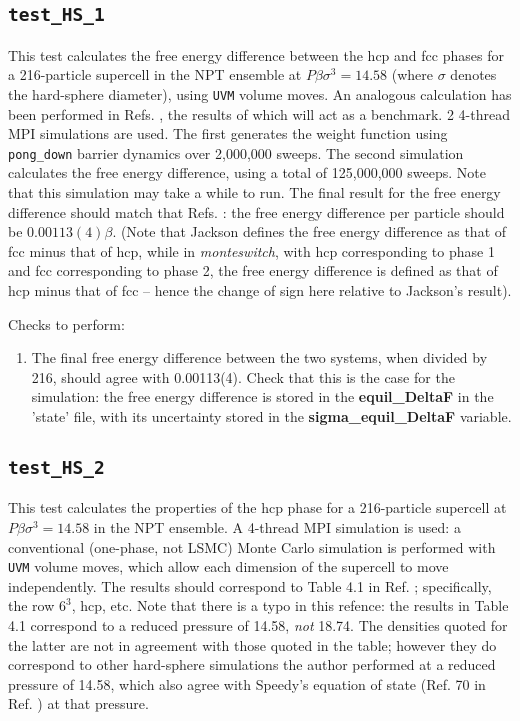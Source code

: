 \documentclass{report}
\begin{document}
\subsection{\texttt{test\_HS\_1}}
This test calculates the free energy difference between the hcp and fcc phases for a 216-particle supercell in the NPT ensemble at
$P\beta\sigma^3=14.58$ (where $\sigma$ denotes the hard-sphere diameter), using \texttt{UVM} volume moves. An analogous calculation
has been performed in Refs. \cite{thesis:Jackson,Bruce_2000}, the results of which will act as a benchmark.
2 4-thread MPI simulations are used. The first generates the weight function using \texttt{pong\_down}
barrier dynamics over 2,000,000 sweeps. The second simulation calculates the free energy difference, using
a total of 125,000,000 sweeps. Note that this simulation may take a while to run. The final result for the free energy difference
should match that Refs. \cite{thesis:Jackson,Bruce_2000}: the free energy difference per particle should be
$0.00113(4)\beta$. (Note that Jackson defines the free energy difference as that of fcc minus that of hcp,
while in \emph{monteswitch}, with hcp corresponding to phase 1 and fcc corresponding to phase 2, the free energy
difference is defined as that of hcp minus that of fcc -- hence the change of sign here
relative to Jackson's result).

Checks to perform:
\begin{enumerate}
\item
The final free energy difference between the two systems, when divided by 216, should agree with 0.00113(4).
Check that this is the case for the simulation: the free energy difference is stored in the \textbf{equil\_DeltaF}
in the 'state' file, with its uncertainty stored in the \textbf{sigma\_equil\_DeltaF} variable.
\end{enumerate}


\subsection{\texttt{test\_HS\_2}}
This test calculates the properties of the hcp phase for a 216-particle supercell at $P\beta\sigma^3=14.58$ in
the NPT ensemble. A 4-thread MPI simulation is used: a conventional (one-phase, not LSMC) Monte Carlo simulation is
performed with \texttt{UVM} volume moves, which allow each dimension of the supercell to move independently. The
results should correspond to Table 4.1 in Ref. \cite{thesis:Jackson}; specifically, the row $6^3$, hcp, etc. Note
that there is a typo in this refence: the results in Table 4.1 correspond to a reduced pressure of 14.58, \emph{not}
18.74. The densities quoted for the latter are not in agreement with those quoted in the table; however they
do correspond to other hard-sphere simulations the author performed at a reduced pressure of 14.58, which also agree with
Speedy's equation of state (Ref. 70 in Ref. \cite{thesis:Jackson}) at that pressure.
\end{document}
